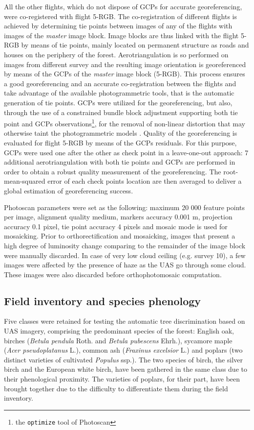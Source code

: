 \documentclass[remotesensing,article,submit,moreauthors,pdftex,12pt,a4paper]{mdpi} %
\begin{document}
All the other flights, which do not dispose of GCPs for accurate georeferencing, were co-registered with flight 5-RGB. 
The co-registration of different flights is achieved by determining tie points between images of any of the flights with images of the {\it master} image block. 
Image blocks are thus linked with the flight 5-RGB by means of tie points, mainly located on permanent structure as roads and houses on the periphery of the forest. 
Aerotriangulation is so performed on images from different survey and the resulting image orientation is georeferenced by means of the GCPs of the {\it master} image block (5-RGB). 
This process ensures a good georeferencing and an accurate co-registration between the flights and take advantage of the available photogrammetric tools, that is the automatic generation of tie points. 
GCPs were utilized for the georeferencing, but also, through the use of a constrained bundle block adjustment supporting both tie point and GCPs observations\footnote{the \texttt{optimize} tool of Photoscan}, for the removal of non-linear distortion that may otherwise taint the photogrammetric models \citep{wu_critical_2014}. 
Quality of the georeferencing is evaluated for flight 5-RGB by means of the GCPs residuals. 
For this purpose, GCPs were used one after the other as check point in a leave-one-out approach: 7 additional aerotriangulation with both tie points and GCPs are performed in order to obtain a robust quality measurement of the georeferencing. 
The root-mean-squared error of each check points location are then averaged to deliver a global estimation of georeferencing success.

Photoscan parameters were set as the following: maximum 20 000 feature points per image, alignment quality medium, markers accuracy 0.001 m, projection accuracy 0.1 pixel, tie point accuracy 4 pixels and mosaic mode is used for mosaicking. 
Prior to orthorectification and mosaicking, images that present a high degree of luminosity change comparing to the remainder of the image block were manually discarded. 
In case of very low cloud ceiling (e.g. survey 10), a few images were affected by the presence of haze as the UAS go through some cloud. 
These images were also discarded before orthophotomosaic computation.

\subsection{Field inventory and species phenology}

Five classes were retained for testing the automatic tree discrimination based on UAS imagery, comprising the predominant species of the forest: English oak, birches (\textit{Betula pendula} Roth. and \textit{Betula pubescens} Ehrh.), sycamore maple (\textit{Acer pseudoplatanus} L.), common ash (\textit{Fraxinus excelsior} L.) and poplars (two distinct varieties of cultivated \textit{Populus} ssp.). 
The two species of birch, the silver birch and the European white birch, have been gathered in the same class due to their phenological proximity. 
The varieties of poplars, for their part, have been brought together due to the difficulty to differentiate them during the field inventory. 
\end{document}
